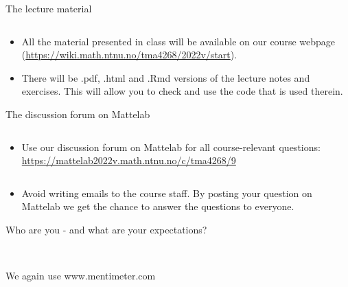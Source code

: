 \documentclass[10pt,ignorenonframetext,]{beamer}
\providecommand{\tightlist}{%
  \setlength{\itemsep}{0pt}\setlength{\parskip}{0pt}}
\begin{document}
\begin{frame}

\begin{block}{The lecture material}

\(~\)

\begin{itemize}
\tightlist
\item
  All the material presented in class will be available on our course
  webpage (\url{https://wiki.math.ntnu.no/tma4268/2022v/start}).
\end{itemize}

\vspace{2mm}

\begin{itemize}
\tightlist
\item
  There will be .pdf, .html and .Rmd versions of the lecture notes and
  exercises. This will allow you to check and use the code that is used
  therein.
\end{itemize}

\end{block}

\end{frame}

\begin{frame}

\begin{block}{The discussion forum on Mattelab}

\(~\)

\begin{itemize}
\tightlist
\item
  Use our discussion forum on Mattelab for all course-relevant
  questions: \url{https://mattelab2022v.math.ntnu.no/c/tma4268/9}
\end{itemize}

\(~\)

\begin{itemize}
\tightlist
\item
  Avoid writing emails to the course staff. By posting your question on
  Mattelab we get the chance to answer the questions to everyone.
\end{itemize}

\end{block}

\end{frame}

\begin{frame}{Who are you - and what are your expectations?}
\protect\hypertarget{who-are-you---and-what-are-your-expectations}{}

~

We again use www.mentimeter.com

\end{frame}
\end{document}
